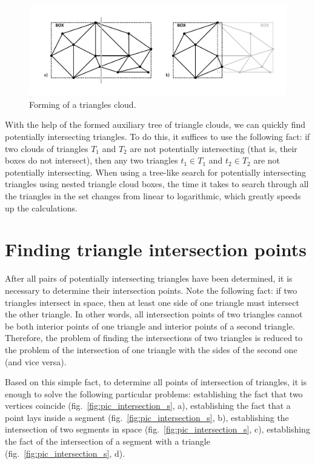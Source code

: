 \documentclass[
11pt,%
tightenlines,%
twoside,%
onecolumn,%
nofloats,%
nobibnotes,%
nofootinbib,%
superscriptaddress,%
noshowpacs,%
centertags]%
{revtex4}
\begin{document}
\begin{figure}[h]
\includegraphics[width=1.0\textwidth]{pics/pic_triangles_cloud_s.pdf}
\caption{Forming of a triangles cloud.}\label{fig:pic_triangles_cloud_s}
\end{figure}

With the help of the formed auxiliary tree of triangle clouds, we can quickly find potentially intersecting triangles.
To do this, it suffices to use the following fact: if two clouds of triangles $T_1$ and $T_2$ are not potentially intersecting (that is, their boxes do not intersect), then any two triangles $t_1 \in T_1$ and $t_2 \in T_2$ are not potentially intersecting.
When using a tree-like search for potentially intersecting triangles using nested triangle cloud boxes, the time it takes to search through all the triangles in the set changes from linear to logarithmic, which greatly speeds up the calculations.

\section{Finding triangle intersection points}

After all pairs of potentially intersecting triangles have been determined, it is necessary to determine their intersection points.
Note the following fact: if two triangles intersect in space, then at least one side of one triangle must intersect the other triangle.
In other words, all intersection points of two triangles cannot be both interior points of one triangle and interior points of a second triangle.
Therefore, the problem of finding the intersections of two triangles is reduced to the problem of the intersection of one triangle with the sides of the second one (and vice versa).

Based on this simple fact, to determine all points of intersection of triangles, it is enough to solve the following particular problems: establishing the fact that two vertices coincide (fig.~\ref{fig:pic_intersection_s}, a), establishing the fact that a point lays inside a segment (fig.~\ref {fig:pic_intersection_s}, b), establishing the intersection of two segments in space (fig.~\ref{fig:pic_intersection_s}, c), establishing the fact of the intersection of a segment with a triangle (fig.~\ref{fig:pic_intersection_s}, d).
\end{document}
